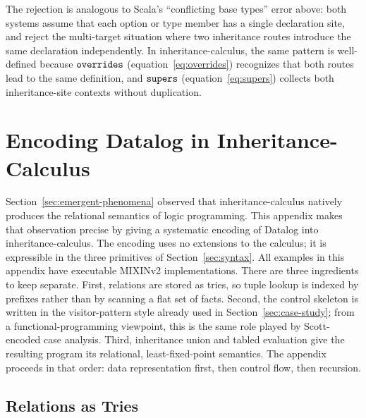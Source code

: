 The rejection is analogous to Scala's ``conflicting base types''
error above: both systems assume that each option or type member
has a single declaration site, and reject the multi-target situation
where two inheritance routes introduce the same declaration
independently.
In inheritance-calculus, the same pattern is well-defined because
$\mathtt{overrides}$ (equation~\ref{eq:overrides}) recognizes that both
routes lead to the same definition, and $\mathtt{supers}$
(equation~\ref{eq:supers}) collects both inheritance-site
contexts without duplication.

\section{Encoding Datalog in Inheritance-Calculus}
\label{app:datalog-encoding}

Section~\ref{sec:emergent-phenomena} observed that
inheritance-calculus natively produces the relational semantics
of logic programming.
This appendix makes that observation precise by giving a
systematic encoding of Datalog into inheritance-calculus.
The encoding uses no extensions to the calculus; it is
expressible in the three primitives of Section~\ref{sec:syntax}.
All examples in this appendix have executable MIXINv2
implementations.
There are three ingredients to keep separate.
First, relations are stored as tries, so tuple lookup is indexed
by prefixes rather than by scanning a flat set of facts.
Second, the control skeleton is written in the visitor-pattern
style already used in Section~\ref{sec:case-study}; from a
functional-programming viewpoint, this is the same role played by
Scott-encoded case analysis.
Third, inheritance union and tabled evaluation give the resulting
program its relational, least-fixed-point semantics.
The appendix proceeds in that order: data representation first,
then control flow, then recursion.

\subsection{Relations as Tries}

